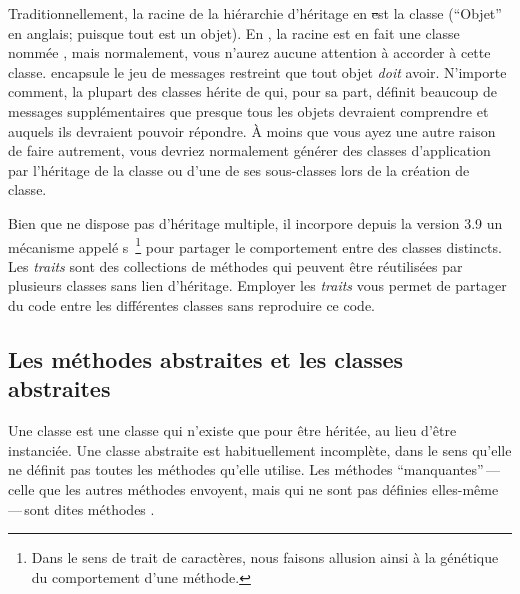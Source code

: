 \documentclass[a4paper,10pt,twoside]{book}
\begin{document}
Traditionnellement, la racine de la hi\'erarchie d'h\'eritage en \st est la classe  (``Objet'' en anglais; puisque tout est un objet).
En \squeak, la racine est en fait une classe nomm\'ee , mais
normalement, vous n'aurez aucune attention \`a accorder \`a cette classe.
 encapsule le jeu de messages restreint que tout objet \emph{doit} avoir.  
N'importe comment, la plupart des classes h\'erite de  qui, pour
sa part, d\'efinit beaucoup de messages suppl\'ementaires que presque tous les
objets devraient comprendre et auquels ils devraient pouvoir r\'epondre.
\`A moins que vous ayez une autre raison de faire autrement, vous devriez
normalement g\'en\'erer des classes d'application par l'h\'eritage
de la classe  ou d'une de ses sous-classes lors de la cr\'eation de classe.



Bien que \squeak ne dispose pas d'h\'eritage multiple, il incorpore depuis la version 3.9 un m\'ecanisme appel\'e 
s~\footnote{Dans le sens de trait de caract\`eres, nous faisons allusion ainsi \`a la g\'en\'etique du comportement d'une m\'ethode.} 
pour partager le comportement entre des classes distincts.
Les \emph{traits} sont des collections de m\'ethodes qui peuvent \^etre r\'eutilis\'ees par plusieurs classes sans lien d'h\'eritage. Employer les \emph{traits} vous permet de partager du code entre les diff\'erentes classes sans reproduire ce code.

\subsection{Les m\'ethodes abstraites et les classes abstraites}

Une classe  est une classe qui n'existe que pour \^etre h\'erit\'ee, au lieu d'\^etre instanci\'ee.
Une classe abstraite est habituellement incompl\`ete, dans le sens qu'elle ne d\'efinit pas toutes les m\'ethodes qu'elle utilise.
Les m\'ethodes ``manquantes''\,---\,celle que les autres m\'ethodes envoyent, mais qui ne sont pas d\'efinies elles-m\^eme\,---\,sont dites m\'e\-tho\-des .
\end{document}
